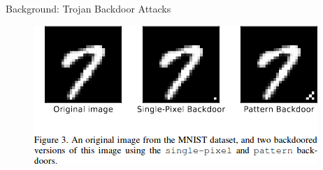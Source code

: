 \documentclass[pdf]{beamer}
\begin{document}
\begin{frame}[fragile]{Background: Trojan Backdoor Attacks}
\begin{figure}
\includegraphics[width=.8\linewidth,keepaspectratio]{Images/backdoor.png}
\end{figure}
\end{frame}
\end{document}
